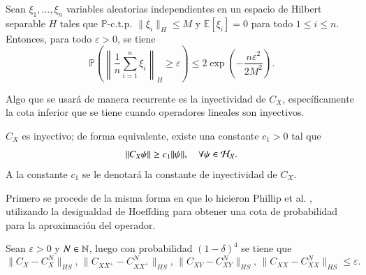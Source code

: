 \begin{cor}
Sean $\xi_1, \dots, \xi_n$ variables aleatorias independientes en un espacio de Hilbert separable $H$ tales que $\mathbb{P}$-c.t.p. $\|\xi_i\|_H \leq M$ y $\mathbb{E}[\xi_i] = 0$ para todo $1 \leq i \leq n$. Entonces, para todo $\varepsilon > 0$, se tiene
\[
\mathbb{P} \left( \left\| \frac{1}{n} \sum_{i=1}^n \xi_i \right\|_H \geq \varepsilon \right) \leq 2 \exp \left( -\frac{n\varepsilon^2}{2M^2} \right).
\]
\end{cor}

Algo que se usará de manera recurrente es la inyectividad de $C_X$, específicamente la cota inferior que se tiene cuando operadores lineales son inyectivos.

\begin{lema}
    $C_X$ es inyectivo; de forma equivalente, existe una constante $c_1 > 0$ tal que
    \[
    \| C_X \psi \| \geq c_1 \| \psi \|, \quad \forall \psi \in \mathcal{H}_{\mathcal{X}}.
    \]
    A la constante $c_1$ se le denotará la constante de inyectividad de $C_X$.
\end{lema}

Primero se procede de la misma forma en que lo hicieron Phillip et al. \cite{Philipp2024ErrorOperator}, utilizando la desigualdad de Hoeffding para obtener una cota de probabilidad para la aproximación del operador.

\begin{prop}
    Sean $\varepsilon > 0$ y $N \in \mathbb{N}$, luego con probabilidad $(1-\delta)^4$ se tiene que
    \[
    \| C_{X} - C_{X}^N \|_{HS}, \, \| C_{XX^+} - C_{XX^+}^N \|_{HS}, \, \| C_{XY} - C_{XY}^N \|_{HS}, \, \| C_{XX} - C_{XX}^N \|_{HS} \leq \varepsilon.
    \]
\end{prop}

